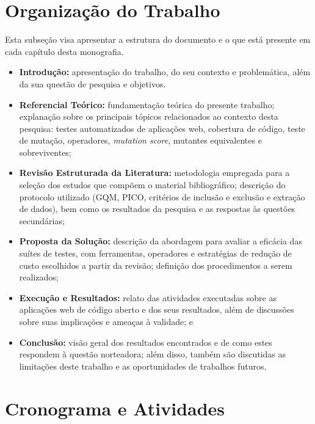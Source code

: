 \section{Organização do Trabalho}
\label{sec:organizacao-trabalho}

Esta subseção visa apresentar a estrutura do documento e o que está presente em cada capítulo desta monografia.

\begin{itemize}
    \item \textbf{Introdução:} apresentação do trabalho, do seu contexto e problemática, além da sua questão de pesquisa e objetivos.

    \item \textbf{Referencial Teórico:} fundamentação teórica do presente trabalho; explanação sobre os principais tópicos relacionados ao contexto desta pesquisa: testes automatizados de aplicações web, cobertura de código, teste de mutação, operadores, \textit{mutation score}, mutantes equivalentes e sobreviventes;

    \item \textbf{Revisão Estruturada da Literatura:} metodologia empregada para a seleção dos estudos que compõem o material bibliográfico; descrição do protocolo utilizado (GQM, PICO, critérios de inclusão e exclusão e extração de dados), bem como os resultados da pesquisa e as respostas às questões secundárias;

    \item \textbf{Proposta da Solução:} descrição da abordagem para avaliar a eficácia das suítes de testes, com ferramentas, operadores e estratégias de redução de custo escolhidos a partir da revisão; definição dos procedimentos a serem realizados;

    \item \textbf{Execução e Resultados:} relato das atividades executadas sobre as aplicações web de código aberto e dos seus resultados, além de discussões sobre suas implicações e ameaças à validade; e

    \item \textbf{Conclusão:} visão geral dos resultados encontrados e de como estes respondem à questão norteadora; além disso, também são discutidas as limitações deste trabalho e as oportunidades de trabalhos futuros.
\end{itemize}


\section{Cronograma e Atividades}
\label{sec:secao17}

